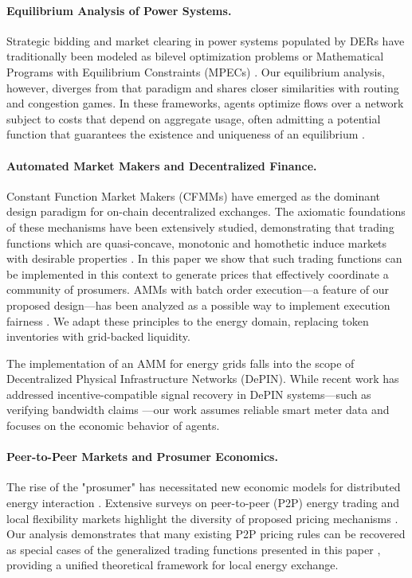 \documentclass[12pt, notitlepage]{article}
\begin{document}
\paragraph{Equilibrium Analysis of Power Systems.} Strategic bidding and market clearing in power systems populated by DERs have traditionally been modeled as bilevel optimization problems or Mathematical Programs with Equilibrium Constraints (MPECs) \citep{hobbs2000strategic,Hasan2008,gabriel2012complementarity}. Our equilibrium analysis, however, diverges from that paradigm and shares closer  similarities with routing and congestion games. In these frameworks, agents optimize flows over a network subject to costs that depend on aggregate usage, often admitting a potential function that guarantees the existence and uniqueness of an equilibrium \citep{rosenthal1973congestion,monderer1996potential}. 

\paragraph{Automated Market Makers and  Decentralized Finance.} Constant Function Market Makers (CFMMs) have emerged as the dominant design paradigm for on-chain decentralized exchanges. The axiomatic foundations of these mechanisms have been extensively studied, demonstrating that trading functions which are quasi-concave, monotonic and homothetic induce markets with desirable properties \citep{angeris2020improved,angeris2023geometry,schlegel2023axioms,fabi2025economics}. In this paper we show that such trading functions can be implemented in this context to generate prices that effectively coordinate a community of prosumers.  AMMs with batch order execution—a feature of our proposed design—has been analyzed as a possible way to implement execution fairness \citep{canidio2023batching, he2024optimaldesignautomatedmarket}. We adapt these principles to the energy domain, replacing token inventories with grid-backed liquidity. 

The implementation of an AMM for energy grids falls into the scope of Decentralized Physical Infrastructure Networks (DePIN). While recent work has addressed incentive-compatible signal recovery in DePIN systems—such as verifying bandwidth claims \citep{milionis2025depin}—our work assumes reliable smart meter data and focuses on the economic behavior of agents.

\paragraph{Peer-to-Peer Markets and Prosumer Economics.} The rise of the "prosumer" has necessitated new economic models for distributed energy interaction \citep{gautier2018prosumersgrid,gautier2024economicsofprosumers}. Extensive surveys on peer-to-peer (P2P) energy trading and local flexibility markets highlight the diversity of proposed pricing mechanisms \citep{SOUSA2019367,CROWLEY2025125154,pinsonP2P,alfaverh2023dynamic}. Our analysis demonstrates that many existing P2P pricing rules can be recovered as special cases of the generalized trading functions presented in this paper \citep{8279516,8572734}, providing a unified theoretical framework for local energy exchange.
\end{document}
